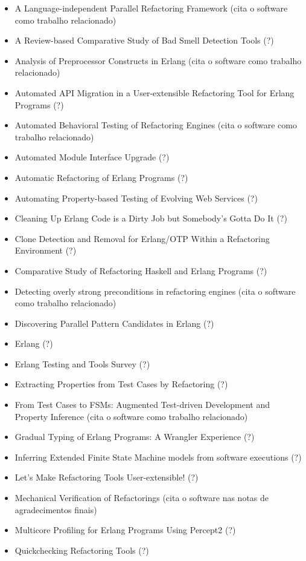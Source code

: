\begin{itemize}
\item A Language-independent Parallel Refactoring Framework (cita o software como trabalho relacionado)
\item A Review-based Comparative Study of Bad Smell Detection Tools (?)
\item Analysis of Preprocessor Constructs in Erlang (cita o software como trabalho relacionado)
\item Automated API Migration in a User-extensible Refactoring Tool for Erlang Programs (?)
\item Automated Behavioral Testing of Refactoring Engines (cita o software como trabalho relacionado)
\item Automated Module Interface Upgrade (?)
\item Automatic Refactoring of Erlang Programs (?)
\item Automating Property-based Testing of Evolving Web Services (?)
\item Cleaning Up Erlang Code is a Dirty Job but Somebody's Gotta Do It (?)
\item Clone Detection and Removal for Erlang/OTP Within a Refactoring Environment (?)
\item Comparative Study of Refactoring Haskell and Erlang Programs (?)
\item Detecting overly strong preconditions in refactoring engines (cita o software como trabalho relacionado)
\item Discovering Parallel Pattern Candidates in Erlang (?)
\item Erlang (?)
\item Erlang Testing and Tools Survey (?)
\item Extracting Properties from Test Cases by Refactoring (?)
\item From Test Cases to FSMs: Augmented Test-driven Development and Property Inference (cita o software como trabalho relacionado)
\item Gradual Typing of Erlang Programs: A Wrangler Experience (?)
\item Inferring Extended Finite State Machine models from software executions (?)
\item Let's Make Refactoring Tools User-extensible! (?)
\item Mechanical Verification of Refactorings (cita o software nas notas de agradecimentos finais)
\item Multicore Profiling for Erlang Programs Using Percept2 (?)
\item Quickchecking Refactoring Tools (?)

\end{itemize}
